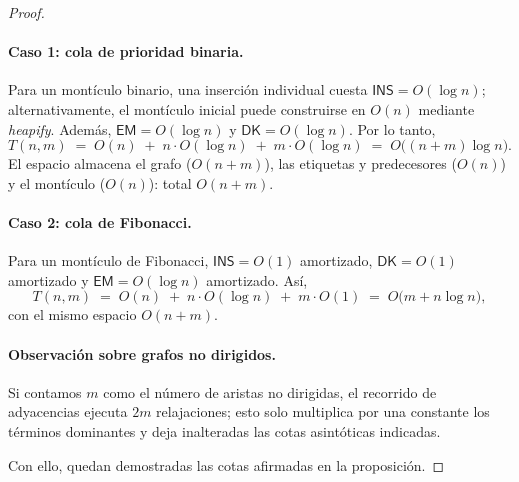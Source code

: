 \begin{proof}
                \paragraph{Caso 1: cola de prioridad binaria.}
                Para un montículo binario, una inserción individual cuesta $\mathsf{INS}=O(\log n)$; alternativamente, el montículo inicial puede construirse en $O(n)$ mediante \emph{heapify}. Además, $\mathsf{EM}=O(\log n)$ y $\mathsf{DK}=O(\log n)$. Por lo tanto,
                \[
                T(n,m)\;=\;O(n)\;+\;n\cdot O(\log n)\;+\;m\cdot O(\log n)\;=\;O\big((n+m)\log n\big).
                \]
                El espacio almacena el grafo ($O(n+m)$), las etiquetas y predecesores ($O(n)$) y el montículo ($O(n)$): total $O(n+m)$.

                \paragraph{Caso 2: cola de Fibonacci.}
                Para un montículo de Fibonacci, $\mathsf{INS}=O(1)$ amortizado, $\mathsf{DK}=O(1)$ amortizado y $\mathsf{EM}=O(\log n)$ amortizado. Así,
                \[
                T(n,m)\;=\;O(n)\;+\;n\cdot O(\log n)\;+\;m\cdot O(1)\;=\;O\big(m+n\log n\big),
                \]
                con el mismo espacio $O(n+m)$.

                \paragraph{Observación sobre grafos no dirigidos.}
                Si contamos $m$ como el número de aristas no dirigidas, el recorrido de adyacencias ejecuta $2m$ relajaciones; esto solo multiplica por una constante los términos dominantes y deja inalteradas las cotas asintóticas indicadas.

                Con ello, quedan demostradas las cotas afirmadas en la proposición.
            \end{proof}

